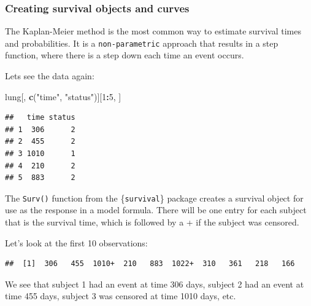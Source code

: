 \documentclass[
]{book}
\newenvironment{Shaded}{\begin{snugshade}}{\end{snugshade}}
\newcommand{\DecValTok}[1]{\textcolor[rgb]{0.00,0.00,0.81}{#1}}
\newcommand{\FunctionTok}[1]{\textcolor[rgb]{0.13,0.29,0.53}{\textbf{#1}}}
\newcommand{\NormalTok}[1]{#1}
\newcommand{\SpecialCharTok}[1]{\textcolor[rgb]{0.81,0.36,0.00}{\textbf{#1}}}
\newcommand{\StringTok}[1]{\textcolor[rgb]{0.31,0.60,0.02}{#1}}
\begin{document}
\hypertarget{creating-survival-objects-and-curves}{%
\subsubsection{Creating survival objects and curves}\label{creating-survival-objects-and-curves}}

The Kaplan-Meier method is the most common way to estimate survival times and probabilities. It is a \texttt{non-parametric} approach that results in a step function, where there is a step down each time an event occurs.

Lets see the data again:

\begin{Shaded}
\begin{Highlighting}[]
\NormalTok{lung[, }\FunctionTok{c}\NormalTok{(}\StringTok{"time"}\NormalTok{, }\StringTok{"status"}\NormalTok{)][}\DecValTok{1}\SpecialCharTok{:}\DecValTok{5}\NormalTok{, ]}
\end{Highlighting}
\end{Shaded}

\begin{verbatim}
##   time status
## 1  306      2
## 2  455      2
## 3 1010      1
## 4  210      2
## 5  883      2
\end{verbatim}

The \texttt{Surv()} function from the \{\texttt{survival}\} package creates a survival object for use as the response in a model formula. There will be one entry for each subject that is the survival time, which is followed by a + if the subject was censored.

Let's look at the first 10 observations:

\begin{Shaded}
\end{Shaded}

\begin{verbatim}
##  [1]  306   455  1010+  210   883  1022+  310   361   218   166
\end{verbatim}

We see that subject 1 had an event at time 306 days, subject 2 had an event at time 455 days, subject 3 was censored at time 1010 days, etc.
\end{document}
